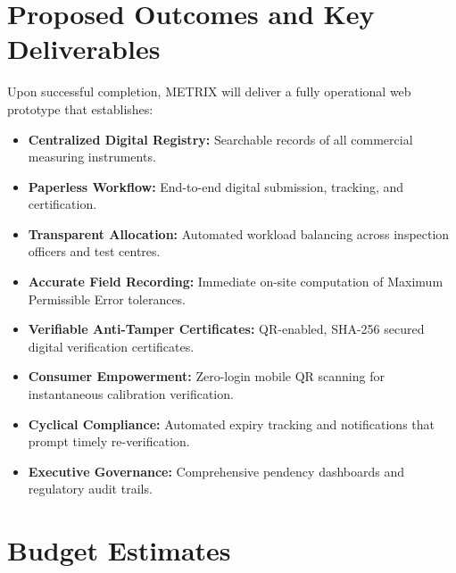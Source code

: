 \documentclass[11pt,a4paper]{article}
\begin{document}
\section{Proposed Outcomes and Key Deliverables}
Upon successful completion, METRIX will deliver a fully operational web prototype that establishes:
\begin{itemize}
    \item \textbf{Centralized Digital Registry:} Searchable records of all commercial measuring instruments.
    \item \textbf{Paperless Workflow:} End-to-end digital submission, tracking, and certification.
    \item \textbf{Transparent Allocation:} Automated workload balancing across inspection officers and test centres.
    \item \textbf{Accurate Field Recording:} Immediate on-site computation of Maximum Permissible Error tolerances.
    \item \textbf{Verifiable Anti-Tamper Certificates:} QR-enabled, SHA-256 secured digital verification certificates.
    \item \textbf{Consumer Empowerment:} Zero-login mobile QR scanning for instantaneous calibration verification.
    \item \textbf{Cyclical Compliance:} Automated expiry tracking and notifications that prompt timely re-verification.
    \item \textbf{Executive Governance:} Comprehensive pendency dashboards and regulatory audit trails.
\end{itemize}

\section{Budget Estimates}
\end{document}
